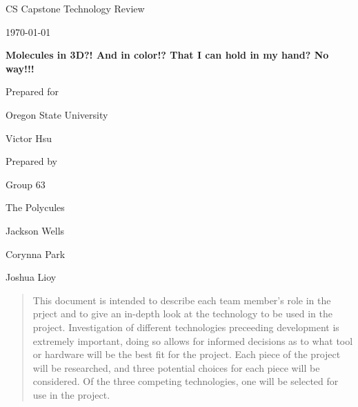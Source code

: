 \documentclass[onecolumn, draftclsnofoot,10pt, compsoc]{IEEEtran}
\def \CapstoneTeamName{			The Polycules}
\def \CapstoneTeamNumber{		63}
\def \GroupMemberOne{			Jackson Wells}
\def \GroupMemberTwo{			Corynna Park}
\def \GroupMemberThree{			Joshua Lioy}
\def \CapstoneProjectName{		Molecules in 3D?! And in color!? That I can hold in my hand? No way!!!}
\def \CapstoneSponsorCompany{		Oregon State University}
\def \CapstoneSponsorPerson{		Victor Hsu}
\def \DocType{			%
				Technology Review
				}
\newcommand{\NameSigPair}[1]{\par
\makebox[2.75in][r]{#1} \hfil 	\makebox[3.25in]{\makebox[2.25in]{\hrulefill} \hfill		\makebox[.75in]{\hrulefill}}
\par\vspace{-12pt} \textit{\tiny\noindent
\makebox[2.75in]{} \hfil		\makebox[3.25in]{\makebox[2.25in][r]{Signature} \hfill	\makebox[.75in][r]{Date}}}}
\renewcommand{\NameSigPair}[1]{#1}
\begin{document}
\begin{titlepage}
    \begin{singlespace}
        \hfill 
        \par\vspace{.2in}
        \centering
        \scshape{
            \huge CS Capstone \DocType \par
            {\large\today}\par
            \vspace{.5in}
            \textbf{\Huge\CapstoneProjectName}\par
            \vfill
            {\large Prepared for}\par
            \Huge \CapstoneSponsorCompany\par
            \vspace{5pt}
            {\Large\NameSigPair{\CapstoneSponsorPerson}\par}
            {\large Prepared by }\par
            Group\CapstoneTeamNumber\par
            \CapstoneTeamName\par 
            \vspace{5pt}
            {\Large
                \NameSigPair{\GroupMemberOne}\par
                \NameSigPair{\GroupMemberTwo}\par
                \NameSigPair{\GroupMemberThree}\par
            }
            \vspace{20pt}
        }
        \begin{abstract}
		This document is intended to describe each team member's role in the prject and to give an in-depth look at the technology to be used in the project.
		Investigation of different technologies preceeding development is extremely important, doing so allows for informed decisions as to what tool or hardware will be the best fit for the project.
		Each piece of the project will be researched, and three potential choices for each piece will be considered.
		Of the three competing technologies, one will be selected for use in the project.
        \end{abstract}     
    \end{singlespace}
\end{titlepage}
\newpage
{}
\tableofcontents
\clearpage
\end{document}
